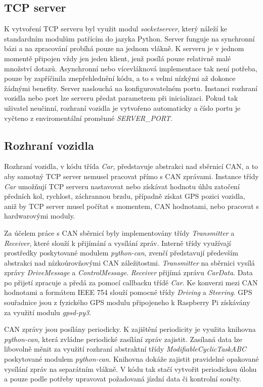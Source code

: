 \documentclass[czech, bachelor]{diploma}
\begin{document}
\subsection{TCP server}
K vytvoření TCP serveru byl využit modul \emph{socketserver}, který náleží ke standardním modulům patřícím do jazyka Python.
Server funguje na synchronní bázi a na zpracování probíhá pouze na jednom vlákně. K serveru je v jednom momentě připojen vždy jen
jeden klient, jenž posílá pouze relativně malé množství dotazů. Asynchronní nebo vícevláknová implementace tak není potřeba,
pouze by zapříčinila znepřehlednění kódu, a to s velmi nízkými až dokonce žádnými benefity. Server naslouchá na konfigurovatelném
portu. Instanci rozhraní vozidla nebo port lze serveru předat parametrem při inicializaci. Pokud tak uživatel neučinní, rozhraní
vozidla je vytvořeno automaticky a číslo portu je vyčteno z enviromentální proměnné \emph{SERVER\_PORT}.

\subsection{Rozhraní vozidla}
Rozhraní vozidla, v kódu třída \emph{Car}, představuje abstrakci nad sběrnicí CAN, a to aby samotný TCP server nemusel pracovat
přímo s CAN zprávami. Instance třídy \emph{Car} umožňují TCP serveru nastavovat nebo získávat hodnotu úhlu zatočení předních kol,
rychlost, záchrannou brzdu, případně získat GPS pozici vozidla, aniž by TCP server musel počítat s momentem, CAN hodnotami, nebo
pracovat s hardwarovými moduly.

Za účelem práce s CAN sběrnicí byly implementovány třídy \emph{Transmitter} a \emph{Receiver}, které slouží k přijímání a vysílání
zpráv. Interně třídy využívají prostředky poskytované modulem \emph{python-can}, zvenčí představují především abstrakci
nad nízkoúrovňovými CAN záležitostmi. \emph{Transmitter} na sběrnici vysílá zprávy \emph{DriveMessage} a \emph{ControlMessage}.
\emph{Receiver} přijímá zprávu \emph{CarData}. Data po přijetí zpracuje a předá za pomocí callbacku třídě \emph{Car}. Ke konverzi
mezi CAN hodnotami a formátem IEEE 754 slouží pomocné třídy \emph{Driving} a \emph{Steering}. GPS souřadnice jsou z fyzického GPS
modulu připojeneho k Raspberry Pi získávány za využití modulu \emph{gpsd-py3}.

CAN zprávy jsou posílány periodicky. K zajištění periodicity je využita knihovna \emph{python-can}, která zvládne periodické
zasílání zpráv zajistit. Zasílaná data lze libovolně měnit za využití rozhraní abstraktní třídy \emph{ModifiableCyclicTaskABC}
poskytované modulem \emph{python-can}. Knihovna dokáže zajistit pravidelné opakované vysílání zpráv na separátním vlákně. V kódu
tak stačí vytvořit periodickou úlohu a pouze podle potřeby upravovat požadovaná jízdní data či kontrolní součty.
\end{document}

